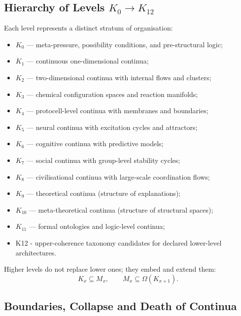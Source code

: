 \subsection{Hierarchy of Levels $K_0 \to K_{12}$}

Each level represents a distinct stratum of organisation:

\begin{itemize}
    \item $K_0$ — meta-pressure, possibility conditions, and pre-structural logic;
    \item $K_1$ — continuous one-dimensional continua;
    \item $K_2$ — two-dimensional continua with internal flows and clusters;
    \item $K_3$ — chemical configuration spaces and reaction manifolds;
    \item $K_4$ — protocell-level continua with membranes and boundaries;
    \item $K_5$ — neural continua with excitation cycles and attractors;
    \item $K_6$ — cognitive continua with predictive models;
    \item $K_7$ — social continua with group-level stability cycles;
    \item $K_8$ — civilisational continua with large-scale coordination flows;
    \item $K_9$ — theoretical continua (structure of explanations);
    \item $K_{10}$ — meta-theoretical continua (structure of structural spaces);
    \item $K_{11}$ — formal ontologies and logic-level continua;
    \item K12 - upper-coherence taxonomy candidates for declared lower-level architectures.
\end{itemize}

Higher levels do not replace lower ones; they embed and extend them:
\[
K_x \subseteq M_x,
\qquad
M_x \subseteq \Omega(K_{x+1}).
\]


\subsection{Boundaries, Collapse and Death of Continua}

